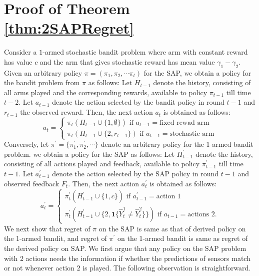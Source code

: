 \documentclass{article}
\begin{document}
\newpage

%

\newpage
\appendix
\section{Proof of Theorem \ref{thm:2SAPRegret}}
Consider a $1$-armed stochastic bandit problem where arm with constant reward has value $c$ and the arm that gives stochastic reward has mean value  $\gamma_1-\gamma_2$.  
Given an arbitrary policy $\pi=(\pi_1, \pi_2, \cdots \pi_t )$ for the SAP, we obtain a policy for the bandit problem from $\pi$ as follows: Let $H_{t-1}$ denote the history, consisting of all arms played and the corresponding rewards, available to policy $\pi_{t-1}$ till time $t-2$. Let $a_{t-1}$ denote the action selected by the bandit policy  in round $t-1$ and $r_{t-1}$ the observed reward. Then, the next action $a_t$ is obtained as follows:
\begin{equation}
\label{eqn:SAPto1Bandit}
a_t=
\begin{cases}
\pi_t(H_{t-1}\cup \{1, \emptyset
\}) \mbox{ if } a_{t-1}= \mbox{fixed rewad arm}	\\
\pi_t(H_{t-1} \cup \{2, r_{t-1}\}) \mbox{ if } a_{t-1}= \mbox{stochastic arm}
\end{cases}
\end{equation}
\noindent
Conversely, let $\pi^\prime=\{\pi^\prime_1, \pi^\prime_2,\cdots\}$ denote an arbitrary policy for the 1-armed bandit problem. we obtain a policy for the SAP as follows: Let $H^\prime_{t-1}$ denote the history, consisting of all actions played and feedback, available to policy $\pi^\prime_{t-1}$ till time $t-1$. Let $a^\prime_{t-1}$ denote the action selected by the SAP policy in round $t-1$ and observed feedback $F_t$. Then, the next action $a^\prime_t$ is obtained as follows:
\begin{equation}
\label{eqn:1BanditToSAP}
a^\prime_t=
\begin{cases}
\pi^\prime_t(H^\prime_{t-1} \cup \{1, c
\}) \mbox{ if } a^\prime_{t-1}= \mbox{action 1}	\\
\pi^\prime_t(H^\prime_{t-1} \cup \{2, \boldsymbol{1}\{\hat{Y}_t^1\neq \hat{Y}_t^2\}\}) \mbox{ if } a_{t-1}= \mbox{actions 2}.
\end{cases}
\end{equation}
We next show that regret of $\pi$ on the SAP is same as that of derived policy on the 1-armed bandit, and  regret of $\pi^\prime$ on the 1-armed bandit is same as regret of the derived policy on SAP. 
We first argue that any policy on the SAP problem with 2 actions needs the information if whether the predictions of sensors match or not whenever action $2$ is played.  The following observation is straightforward.
\end{document}
